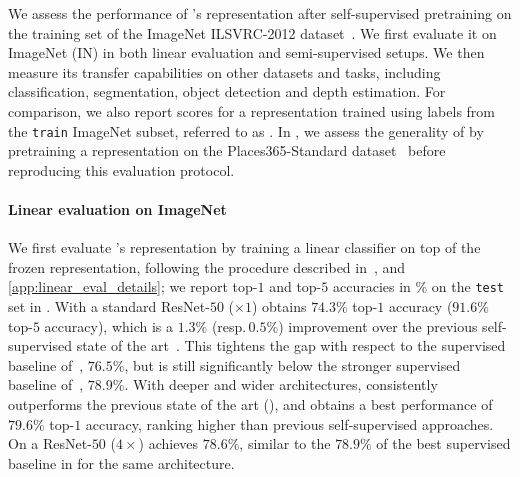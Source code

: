 \vspace{-0.4em}
We assess the performance of \algo 's representation %
after self-supervised pretraining on the training set of the ImageNet ILSVRC-2012 dataset~\cite{ILSVRC15}. We first evaluate it on ImageNet (IN) in both linear evaluation and semi-supervised setups. We then measure its transfer capabilities on other datasets and tasks, including classification, segmentation, object detection and depth estimation. For comparison, we also report scores for a representation trained using labels from the \texttt{train\xspace} ImageNet subset, referred to as \supervisedbaseline. In , we assess the generality of \algo by pretraining a representation on the Places365-Standard dataset~\cite{zhou2017places} before reproducing this evaluation protocol.

\vfill
\paragraph{Linear evaluation on ImageNet}
We first evaluate \algo's representation by training a linear classifier on top of the frozen representation, following the procedure described in~\cite{kolesnikov2019revisiting,kornblith2019better,Zhang2016ColorfulIC,CPC,SimCLR}, and \cref{app:linear_eval_details}; we report top-$1$ and top-$5$ accuracies in \% on the \texttt{test\xspace} set in . With a standard ResNet-$50$ ($\times 1$) \algo obtains $74.3\%$ top-$1$ accuracy ($91.6\%$ top-$5$ accuracy), which is a $1.3\%$ (resp.\,$0.5\%$) improvement over the previous self-supervised state of the art~\cite{Tian2020WhatMF}. This tightens the gap with respect to the supervised baseline of~\cite{SimCLR}, $76.5\%$, but is still significantly below the stronger supervised baseline of~\cite{gong2020maxup}, $78.9\%$. With deeper and wider architectures, \algo consistently outperforms the previous state of the art (), and obtains a best performance of $79.6\%$ top-$1$ accuracy, ranking higher than previous self-supervised approaches. On a ResNet-$50$ ($4\times$) \algo achieves $78.6\%$, similar to the $78.9\%$ of the best supervised baseline in \cite{SimCLR} for the same architecture. 

\vfill

